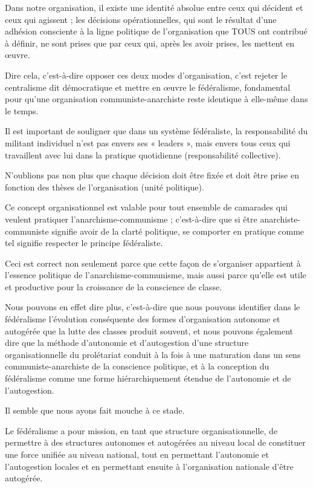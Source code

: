 Dans notre organisation, il existe une identité absolue entre ceux qui décident et ceux qui agissent ; les décisions opérationnelles, qui sont le résultat d'une adhésion consciente à la ligne politique de l'organisation que TOUS ont contribué à définir, ne sont prises que par ceux qui, après les avoir prises, les mettent en œuvre.

Dire cela, c'est-à-dire opposer ces deux modes d'organisation, c'est rejeter le centralisme dit démocratique et mettre en œuvre le fédéralisme, fondamental pour qu'une organisation communiste-anarchiste reste identique à elle-même dans le temps.

Il est important de souligner que dans un système fédéraliste, la responsabilité du militant individuel n'est pas envers ses « leaders », mais envers tous ceux qui travaillent avec lui dans la pratique quotidienne (responsabilité collective).

N'oublions pas non plus que chaque décision doit être fixée et doit être prise en fonction des thèses de l'organisation (unité politique).

Ce concept organisationnel est valable pour tout ensemble de camarades qui veulent pratiquer l'anarchisme-communisme ; c'est-à-dire que si être anarchiste-communiste signifie avoir de la clarté politique, se comporter en pratique comme tel signifie respecter le principe fédéraliste.

Ceci est correct non seulement parce que cette façon de s'organiser appartient à l'essence politique de l'anarchisme-communisme, mais aussi parce qu'elle est utile et productive pour la croissance de la conscience de classe.

Nous pouvons en effet dire plus, c'est-à-dire que nous pouvons identifier dans le fédéralisme l'évolution conséquente des formes d'organisation autonome et autogérée que la lutte des classes produit souvent, et nous pouvons également dire que la méthode d'autonomie et d'autogestion d'une structure organisationnelle du prolétariat conduit à la fois à une maturation dans un sens communiste-anarchiste de la conscience politique, et à la conception du fédéralisme comme une forme hiérarchiquement étendue de l'autonomie et de l'autogestion.

Il semble que nous ayons fait mouche à ce stade.

Le fédéralisme a pour mission, en tant que structure organisationnelle, de permettre à des structures autonomes et autogérées au niveau local de constituer une force unifiée au niveau national, tout en permettant l'autonomie et l'autogestion locales et en permettant ensuite à l'organisation nationale d'être autogérée.

